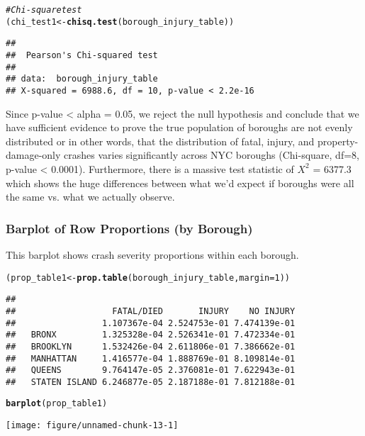 \documentclass[10pt]{article}\usepackage[]{graphicx}\usepackage[]{xcolor}
\makeatletter
\def\maxwidth{ %
  \ifdim\Gin@nat@width>\linewidth
    \linewidth
  \else
    \Gin@nat@width
  \fi
}
\newcommand{\hlnum}[1]{\textcolor[rgb]{0.686,0.059,0.569}{#1}}%
\newcommand{\hlcom}[1]{\textcolor[rgb]{0.678,0.584,0.686}{\textit{#1}}}%
\newcommand{\hldef}[1]{\textcolor[rgb]{0.345,0.345,0.345}{#1}}%
\newcommand{\hlkwb}[1]{\textcolor[rgb]{0.69,0.353,0.396}{#1}}%
\newcommand{\hlkwc}[1]{\textcolor[rgb]{0.333,0.667,0.333}{#1}}%
\newcommand{\hlkwd}[1]{\textcolor[rgb]{0.737,0.353,0.396}{\textbf{#1}}}%
\newenvironment{kframe}{%
 \def\at@end@of@kframe{}%
 \ifinner\ifhmode%
  \def\at@end@of@kframe{\end{minipage}}%
  \begin{minipage}{\columnwidth}%
 \fi\fi%
 \def\FrameCommand##1{\hskip\@totalleftmargin \hskip-\fboxsep
 \colorbox{shadecolor}{##1}\hskip-\fboxsep
     \hskip-\linewidth \hskip-\@totalleftmargin \hskip\columnwidth}%
 \MakeFramed {\advance\hsize-\width
   \@totalleftmargin\z@ \linewidth\hsize
   \@setminipage}}%
 {\par\unskip\endMakeFramed%
 \at@end@of@kframe}
\newenvironment{knitrout}{}{} %
\makeatother
\begin{document}
\begin{knitrout}
\color{fgcolor}\begin{kframe}
\begin{alltt}
\hlcom{# Chi-square test}
\hldef{(chi_test1} \hlkwb{<-} \hlkwd{chisq.test}\hldef{(borough_injury_table))}
\end{alltt}
\begin{verbatim}
## 
## 	Pearson's Chi-squared test
## 
## data:  borough_injury_table
## X-squared = 6988.6, df = 10, p-value < 2.2e-16
\end{verbatim}
\end{kframe}
\end{knitrout}

Since p-value < alpha = 0.05, we reject the null hypothesis and conclude that we have sufficient evidence to prove the true population of boroughs are not evenly distributed or in other words, that the distribution of fatal, injury, and property-damage-only crashes varies significantly across NYC boroughs (Chi-square, df=8, p-value < 0.0001). Furthermore, there is a massive test statistic of $X^2$ = 6377.3 which shows the huge differences between what we'd expect if boroughs were all the same vs. what we actually observe.


\subsubsection{Barplot of Row Proportions (by Borough)}
This barplot shows crash severity proportions within each borough.

\begin{knitrout}
\color{fgcolor}\begin{kframe}
\begin{alltt}
\hldef{(prop_table1} \hlkwb{<-} \hlkwd{prop.table}\hldef{(borough_injury_table,} \hlkwc{margin} \hldef{=} \hlnum{1}\hldef{))}
\end{alltt}
\begin{verbatim}
##                
##                   FATAL/DIED       INJURY    NO INJURY
##                 1.107367e-04 2.524753e-01 7.474139e-01
##   BRONX         1.325328e-04 2.526341e-01 7.472334e-01
##   BROOKLYN      1.532426e-04 2.611806e-01 7.386662e-01
##   MANHATTAN     1.416577e-04 1.888769e-01 8.109814e-01
##   QUEENS        9.764147e-05 2.376081e-01 7.622943e-01
##   STATEN ISLAND 6.246877e-05 2.187188e-01 7.812188e-01
\end{verbatim}
\begin{alltt}
\hlkwd{barplot}\hldef{(prop_table1)}
\end{alltt}
\end{kframe}
\texttt{[image: figure/unnamed-chunk-13-1]} 
\end{knitrout}
\end{document}

